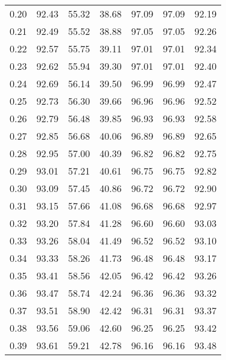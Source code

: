 \begin{tabular}{|c|c|c|c|c|c|c|}
      0.20 &     92.43 &     55.32 &      38.68 &   97.09 &      97.09 &         92.19 \\
      0.21 &     92.49 &     55.52 &      38.88 &   97.05 &      97.05 &         92.26 \\
      0.22 &     92.57 &     55.75 &      39.11 &   97.01 &      97.01 &         92.34 \\
      0.23 &     92.62 &     55.94 &      39.30 &   97.01 &      97.01 &         92.40 \\
      0.24 &     92.69 &     56.14 &      39.50 &   96.99 &      96.99 &         92.47 \\
      0.25 &     92.73 &     56.30 &      39.66 &   96.96 &      96.96 &         92.52 \\
      0.26 &     92.79 &     56.48 &      39.85 &   96.93 &      96.93 &         92.58 \\
      0.27 &     92.85 &     56.68 &      40.06 &   96.89 &      96.89 &         92.65 \\
      0.28 &     92.95 &     57.00 &      40.39 &   96.82 &      96.82 &         92.75 \\
      0.29 &     93.01 &     57.21 &      40.61 &   96.75 &      96.75 &         92.82 \\
      0.30 &     93.09 &     57.45 &      40.86 &   96.72 &      96.72 &         92.90 \\
      0.31 &     93.15 &     57.66 &      41.08 &   96.68 &      96.68 &         92.97 \\
      0.32 &     93.20 &     57.84 &      41.28 &   96.60 &      96.60 &         93.03 \\
      0.33 &     93.26 &     58.04 &      41.49 &   96.52 &      96.52 &         93.10 \\
      0.34 &     93.33 &     58.26 &      41.73 &   96.48 &      96.48 &         93.17 \\
      0.35 &     93.41 &     58.56 &      42.05 &   96.42 &      96.42 &         93.26 \\
      0.36 &     93.47 &     58.74 &      42.24 &   96.36 &      96.36 &         93.32 \\
      0.37 &     93.51 &     58.90 &      42.42 &   96.31 &      96.31 &         93.37 \\
      0.38 &     93.56 &     59.06 &      42.60 &   96.25 &      96.25 &         93.42 \\
      0.39 &     93.61 &     59.21 &      42.78 &   96.16 &      96.16 &         93.48 \\

\end{tabular}
